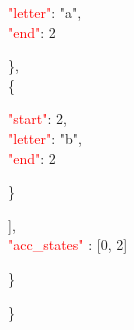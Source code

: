 \begin{adjustwidth}{7.5 mm}{0 cm}
\begin{adjustwidth}{7.5 mm}{0 cm}
\begin{adjustwidth}{7.5 mm}{0 cm}
\begin{adjustwidth}{7.5 mm}{0 cm}
                    \textcolor{red}{"letter"}: "a",\\
                    \textcolor{red}{"end"}: 2
               \end{adjustwidth}
            \},\\
            \{
            \begin{adjustwidth}{7.5 mm}{0 cm}
                    \textcolor{red}{"start"}: 2,\\
                    \textcolor{red}{"letter"}: "b",\\
                    \textcolor{red}{"end"}: 2
               \end{adjustwidth}
            \}
            \end{adjustwidth}
            ],\\
        \textcolor{red}{"acc\_states" }: [0, 2]
    \end{adjustwidth}
    \}
\end{adjustwidth}
\}

